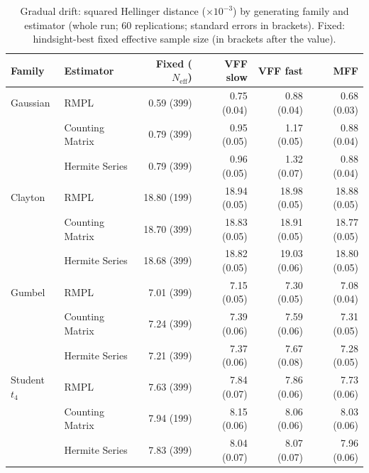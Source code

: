 \begin{table}[htbp]
\centering
\small
\caption{Gradual drift: squared Hellinger distance ($\times10^{-3}$) by generating family and estimator (whole run; 60 replications; standard errors in brackets). Fixed: hindsight-best fixed effective sample size (in brackets after the value).}
\label{tab:app-strategy-h2-drift}
\begin{tabular}{llrrrr}
\toprule
Family & Estimator & Fixed ($N_{\mathrm{eff}}$) & VFF slow & VFF fast & MFF \\
\midrule
Gaussian & RMPL & 0.59 (399) & 0.75 (0.04) & 0.88 (0.04) & 0.68 (0.03) \\
 & Counting Matrix & 0.79 (399) & 0.95 (0.05) & 1.17 (0.05) & 0.88 (0.04) \\
 & Hermite Series & 0.79 (399) & 0.96 (0.05) & 1.32 (0.07) & 0.88 (0.04) \\
\addlinespace
Clayton & RMPL & 18.80 (199) & 18.94 (0.05) & 18.98 (0.05) & 18.88 (0.05) \\
 & Counting Matrix & 18.70 (399) & 18.83 (0.05) & 18.91 (0.05) & 18.77 (0.05) \\
 & Hermite Series & 18.68 (399) & 18.82 (0.05) & 19.03 (0.06) & 18.80 (0.05) \\
\addlinespace
Gumbel & RMPL & 7.01 (399) & 7.15 (0.05) & 7.30 (0.05) & 7.08 (0.04) \\
 & Counting Matrix & 7.24 (399) & 7.39 (0.06) & 7.59 (0.06) & 7.31 (0.05) \\
 & Hermite Series & 7.21 (399) & 7.37 (0.06) & 7.67 (0.08) & 7.28 (0.05) \\
\addlinespace
Student $t_4$ & RMPL & 7.63 (399) & 7.84 (0.07) & 7.86 (0.06) & 7.73 (0.06) \\
 & Counting Matrix & 7.94 (199) & 8.15 (0.06) & 8.06 (0.06) & 8.03 (0.06) \\
 & Hermite Series & 7.83 (399) & 8.04 (0.07) & 8.07 (0.07) & 7.96 (0.06) \\
\bottomrule
\end{tabular}
\end{table}

